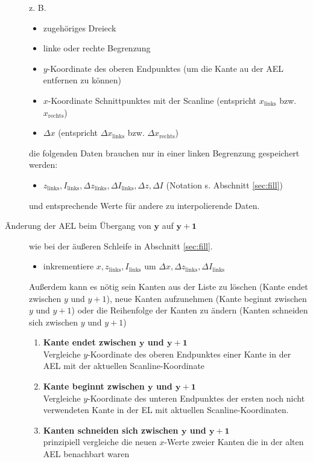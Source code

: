 \begin{description}
	z. B.
	\begin{itemize}
	\item zugehöriges Dreieck
	\item linke oder rechte Begrenzung
	\item $y$-Koordinate des oberen Endpunktes (um die Kante au der AEL entfernen zu können)
	\item $x$-Koordinate Schnittpunktes mit der Scanline (entspricht $x_{\mathrm{links}}$ bzw. $x_{\mathrm{rechts}}$)
	\item $\Delta x$ (entspricht $\Delta x_{\mathrm{links}}$ bzw. $\Delta x_{\mathrm{rechts}}$)
	\end{itemize}
	die folgenden Daten brauchen nur in einer linken Begrenzung gespeichert werden:
	\begin{itemize}
	 \item $z_{\mathrm{links}}, I_{\mathrm{links}}, \Delta z_{\mathrm{links}}, \Delta I_{\mathrm{links}}, \Delta z,
		\Delta I$ (Notation s. Abschnitt \ref{sec:fill})
	\end{itemize}
	und entsprechende Werte für andere zu interpolierende Daten.
\item[Änderung der AEL beim Übergang von $\boldsymbol{y}$ auf $\boldsymbol{y+1}$] wie bei der äußeren Schleife in
	Abschnitt \ref{sec:fill}.
	\begin{itemize}
	 \item inkrementiere $x, z_{\mathrm{links}}, I_{\mathrm{links}}$ um $\Delta x, \Delta z_{\mathrm{links}},
		\Delta I_{\mathrm{links}}$
	\end{itemize}
	Außerdem kann es nötig sein Kanten aus der Liste zu löschen (Kante endet zwischen $y$ und $y+1$),
	neue Kanten aufzunehmen (Kante beginnt zwischen $y$ und $y+1$) oder die Reihenfolge der Kanten zu ändern
	(Kanten schneiden sich zwischen $y$ und $y+1$)
	\begin{enumerate}
	 \newcommand{\bs}{\boldsymbol}
	 \item \textbf{Kante endet zwischen $\bs y$ und $\bs{y+1}$}\\
		Vergleiche $y$-Koordinate des oberen Endpunktes einer Kante in der AEL mit der aktuellen
		Scanline-Koordinate
	 \item \textbf{Kante beginnt zwischen $\bs y$ und $\bs{y+1}$}\\
		Vergleiche $y$-Koordinate des unteren Endpunktes der ersten noch nicht verwendeten Kante in der EL
		mit aktuellen Scanline-Koordinaten.
	 \item \textbf{Kanten schneiden sich zwischen $\bs y$ und $\bs{y+1}$}\\
		prinzipiell vergleiche die neuen $x$-Werte zweier Kanten die in der alten AEL benachbart waren

\end{enumerate}
\end{description}
